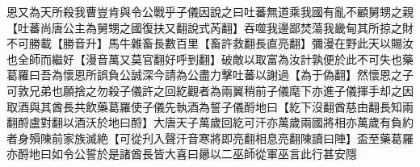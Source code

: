 恩又為天所殺我曹豈肯與令公戰乎子儀因說之曰吐蕃無道乘我國有亂不顧舅甥之親【吐蕃尚唐公主為舅甥之國復扶又翻說式芮翻】吞噬我邊鄙焚蕩我畿甸其所掠之財不可勝載【勝音升】馬牛雜畜長數百里【畜許救翻長直亮翻】彌漫在野此天以賜汝也全師而繼好【漫音萬又莫官翻好呼到翻】破敵以取富為汝計孰便於此不可失也藥葛羅曰吾為懷恩所誤負公誠深今請為公盡力擊吐蕃以謝過【為于偽翻】然懷恩之子可敦兄弟也願捨之勿殺子儀許之回紇觀者為兩翼稍前子儀麾下亦進子儀揮手却之因取酒與其酋長共飲藥葛羅使子儀先執酒為誓子儀酹地曰【紇下沒翻酋慈由翻長知兩翻酹盧對翻以酒沃於地曰酹】大唐天子萬歲回紇可汗亦萬歲兩國將相亦萬歲有負約者身殞陳前家族滅絶【可從刋入聲汗音寒將即亮翻相息亮翻陳讀曰陣】盃至藥葛羅亦酹地曰如令公誓於是諸酋長皆大喜曰曏以二巫師從軍巫言此行甚安隱